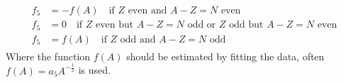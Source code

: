 \begin{itemize}
      \begin{align}
          \begin{split}
          \label{eq:pair}
          f_5 &= -f(A) \quad \text{if $Z$ even and $A-Z=N$ even}\\
          f_5 &=  0    \quad \text{if $Z$ even but $A-Z=N$ odd or $Z$ odd but $A-Z=N$ even}\\
          f_5 &=  f(A) \quad \text{if $Z$ odd and $A-Z=N$ odd}
          \end{split}
      \end{align}
      Where the function $f(A)$ should be estimated by fitting the data, 
      often $f(A) = a_5 A^{-\frac{1}{2}}$ is used.
\end{itemize}
\clearpage


